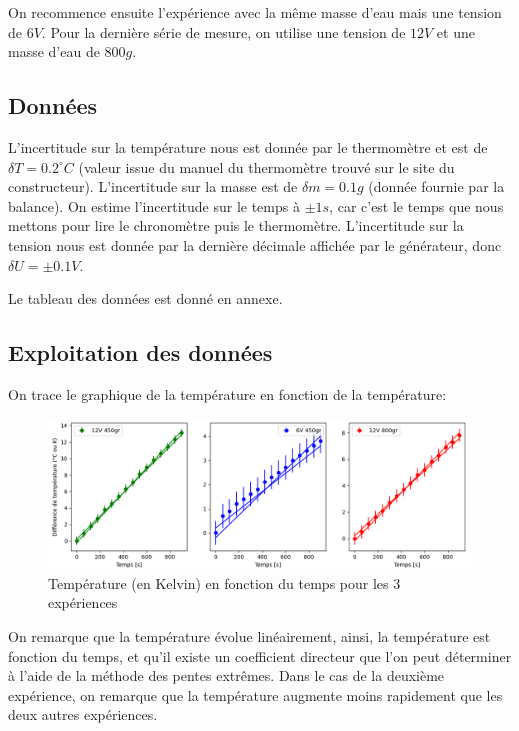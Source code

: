 \documentclass[12pt]{article}
\begin{document}
On recommence ensuite l'expérience avec la même masse d'eau mais une tension de $6V$. Pour la dernière série de mesure, on utilise une tension de $12V$ et une masse d'eau de $800g$.

\subsection{Données}

L'incertitude sur la température nous est donnée par le thermomètre et est de $\delta T = 0.2^\circ C$ (valeur issue du manuel du thermomètre trouvé sur le site du constructeur). 
L'incertitude sur la masse est de $\delta m = 0.1g$ (donnée fournie par la balance). 
On estime l'incertitude sur le temps à $\pm 1s$, car c'est le temps que nous mettons pour lire le chronomètre puis le thermomètre. 
L'incertitude sur la tension nous est donnée par la dernière décimale affichée par le générateur, donc $\delta U = \pm 0.1V$.

	Le tableau des données est donné en annexe.

\newpage
\subsection{Exploitation des données}

On trace le graphique de la température en fonction de la température:

\begin{figure}[h!]
	\begin{center}
		\includegraphics[scale=0.64]{img/Figure_1.png}
	\end{center}
	\label{fig:graph1}
	\caption{Température (en Kelvin) en fonction du temps pour les 3 expériences}
\end{figure}

On remarque que la température évolue linéairement, ainsi, la température est fonction du temps, et qu'il existe un coefficient directeur que l'on peut déterminer à l'aide de la méthode des pentes extrêmes.
Dans le cas de la deuxième expérience, on remarque que la température augmente moins rapidement que les deux autres expériences. 
\end{document}
